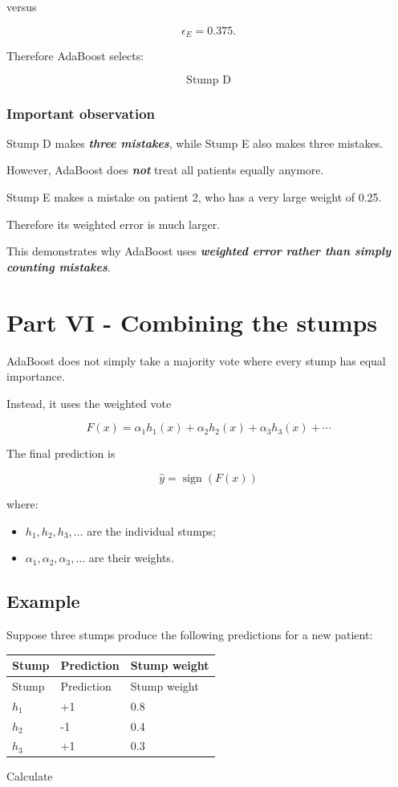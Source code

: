 \documentclass[10pt]{article}
\begin{document}
versus

\[
\epsilon_E=0.375.
\]

Therefore AdaBoost selects:

\[
{\text{Stump D}}
\]

\subsubsection*{Important observation}
Stump D makes \textbf{\textit{three mistakes}}, while Stump E also makes three mistakes.

However, AdaBoost does \textbf{\textit{not}} treat all patients equally anymore.

Stump E makes a mistake on patient 2, who has a very large weight of 0.25.

Therefore its weighted error is much larger.

This demonstrates why AdaBoost uses \textbf{\textit{weighted error rather than simply counting mistakes}}.

\par\endgroup

\clearpage
\section*{Part VI - Combining the stumps}
AdaBoost does not simply take a majority vote where every stump has equal importance.

Instead, it uses the weighted vote

\[
{
F(x)
=
\alpha_1h_1(x)
+
\alpha_2h_2(x)
+
\alpha_3h_3(x)+\cdots
}
\]

The final prediction is

\[
{
\hat y=\operatorname{sign}(F(x))
}
\]

where:

\begin{itemize}
\item
$h_1,h_2,h_3,\ldots$ are the individual stumps;

\item
$\alpha_1,\alpha_2,\alpha_3,\ldots$ are their weights.

\end{itemize}
\subsection*{Example}
Suppose three stumps produce the following predictions for a new patient:

\begingroup
\small
\setlength{\tabcolsep}{4pt}
\begin{longtable}{l|l|l}
Stump & Prediction & Stump weight \\[1.5pt]
\hline
\endfirsthead
Stump & Prediction & Stump weight \\[1.5pt]
\hline
\endhead
$h_1$ & +1 & 0.8 \\[1.5pt]
$h_2$ & -1 & 0.4 \\[1.5pt]
$h_3$ & +1 & 0.3 \\[1.5pt]
\end{longtable}
\endgroup
Calculate
\end{document}
